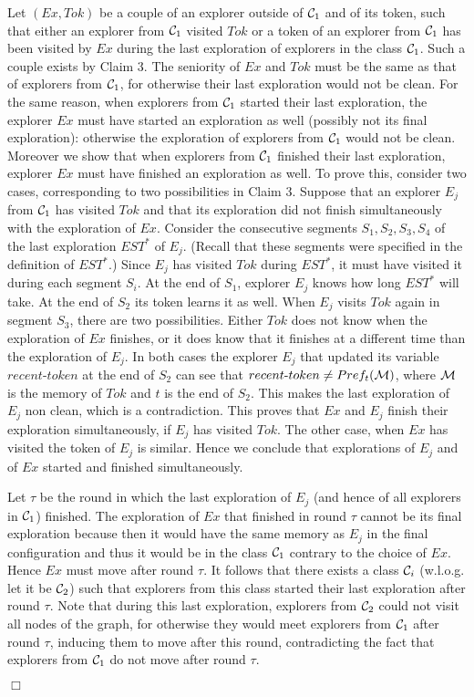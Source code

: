 \documentclass[11pt]{article}
\newcommand{\qed}{\hfill $\Box$ \bigbreak}
\newenvironment{proof}{\noindent {\bf Proof.}}{\qed}
\newcommand{\cC}{{\cal C}}
\newcommand{\cM}{{\cal M}}
\begin{document}
\begin{proof}
Let $(Ex,Tok)$ be a couple of an explorer outside of  $\cC_1$ and of its token, such that either an explorer from $\cC_1$ visited $Tok$ or a token of an explorer
from $\cC_1$ has been visited by $Ex$ during the last exploration of explorers in the class $\cC_1$. Such a couple exists by {Claim 3}. The seniority of $Ex$ and $Tok$ must be the same as that of explorers from  $\cC_1$,
for otherwise their last exploration would not be clean. For the same reason, when explorers from $\cC_1$ started their last exploration, the explorer $Ex$ must
have started an exploration as well (possibly not its final exploration):  otherwise the exploration of explorers from $\cC_1$ would not be clean. Moreover we show that
 when explorers from $\cC_1$ finished their last exploration, explorer $Ex$ must have finished an exploration as well. To prove this, consider two cases, corresponding
 to two possibilities in {Claim 3}.  Suppose that an explorer $E_j$ from $\cC_1$ has visited $Tok$ and that its exploration did not finish simultaneously with the exploration
 of $Ex$. Consider the consecutive segments $S_1,S_2,S_3,S_4$ of the last exploration $EST^*$ of $E_j$. (Recall that these segments were specified in the definition of $EST^*$.) Since $E_j$ has visited $Tok$ during $EST^*$, it must have visited it during each segment $S_i$. At the end of $S_1$, explorer $E_j$ knows how long
 $EST^*$ will take. At the end of $S_2$ its token learns it as well. When $E_j$ visits $Tok$ again in segment $S_3$, there are two possibilities. 
 Either $Tok$ does not
 know when the exploration of $Ex$ finishes, or it does know that it finishes at a different time than the exploration of $E_j$. In both cases the explorer $E_j$ that
 updated its variable $recent$-$token$ at the end of $S_2$ can see that $recent\mbox{-}token \neq Pref_t(\cM)$, where $\cM$ is the memory of $Tok$ and $t$ is the end of $S_2$. 
This makes the last exploration of $E_j$ non clean, which is a contradiction. This proves that  $Ex$ and $E_j$ finish their exploration simultaneously, if $E_j$
has visited $Tok$. The other case, when $Ex$ has visited the token of $E_j$ is similar. Hence we conclude that explorations of $E_j$ and of $Ex$ started
and finished simultaneously.

Let $\tau$ be the round in which the last exploration of $E_j$ (and hence of all explorers in $\cC_1$) finished. The exploration of $Ex$ that finished in round $\tau$
cannot be its final exploration because then it would have the same memory as $E_j$ in the final configuration and thus it would be in the class  $\cC_1$ 
contrary to the choice of $Ex$. Hence $Ex$ must move after round $\tau$. It follows that there exists a class $\cC_i$ (w.l.o.g. let it be $\cC_2$) such that explorers 
from this class started their last exploration after round $\tau$. Note that during this last exploration, explorers from $\cC_2$ could not visit all nodes of the graph, for otherwise they would meet explorers from $\cC_1$ after round $\tau$, inducing them to move after this round, contradicting the fact that explorers from $\cC_1$
do not move after round $\tau$.


\end{proof}
\end{document}
